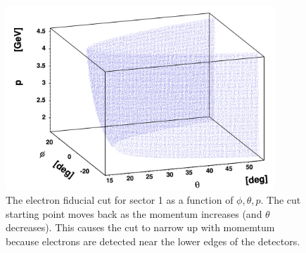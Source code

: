 \begin{figure}[h]
    \centering
    \includegraphics[width=0.9\textwidth ]{img/electron_tphp}
    \caption{The electron fiducial cut for sector 1 as a function of  $\phi, \theta, p$.
    The cut starting point moves back
    as the momentum increases (and $\theta$ decreases). This causes the cut
    to narrow up with momemtum because electrons are detected near the lower
    edges of the detectors.}
    \label{fig:fidu_e3d}
\end{figure}



\clearpage\newpage



